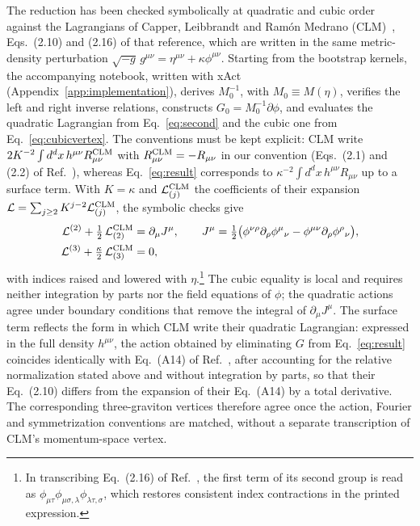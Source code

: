 \documentclass[prd,aps,preprint,nofootinbib,amsmath,amssymb,eqsecnum]{revtex4-2}
\begin{document}
The reduction has been checked symbolically at quadratic and cubic order against the
Lagrangians of Capper, Leibbrandt and Ram\'on Medrano (CLM)~\cite{CLM1973}, Eqs.~(2.10) and
(2.16) of that reference, which are written in the same metric-density perturbation
$\sqrt{-g}\,g^{\mu\nu}=\eta^{\mu\nu}+\kappa\phi^{\mu\nu}$. Starting from the bootstrap
kernels, the accompanying notebook, written with xAct~\cite{xAct,xPerm,xTras}
(Appendix~\ref{app:implementation}), derives
$M_0^{-1}$, with $M_0\equiv M(\eta)$, verifies the left and right inverse relations,
constructs $G_0=M_0^{-1}\partial\phi$, and evaluates the quadratic Lagrangian from
Eq.~\eqref{eq:second} and the cubic one from Eq.~\eqref{eq:cubicvertex}. The conventions
must be kept explicit: CLM write $2K^{-2}\int d^dx\,h^{\mu\nu}R^{\rm CLM}_{\mu\nu}$ with
$R^{\rm CLM}_{\mu\nu}=-R_{\mu\nu}$ in our convention (Eqs.~(2.1) and (2.2) of
Ref.~\cite{CLM1973}), whereas Eq.~\eqref{eq:result}
corresponds to $\kappa^{-2}\int d^dx\,h^{\mu\nu}R_{\mu\nu}$ up to a surface term. With
$K=\kappa$ and $\mathcal L^{\rm CLM}_{(j)}$ the coefficients of their expansion
$\mathcal L=\sum_{j\ge2}K^{j-2}\mathcal L^{\rm CLM}_{(j)}$, the symbolic checks give
\begin{subequations}
\label{eq:clm}
\begin{align}
\mathcal L^{(2)}+\tfrac12\,\mathcal L^{\rm CLM}_{(2)}&=\partial_\mu J^\mu,\qquad
J^\mu=\tfrac12\big(\phi^{\nu\rho}\partial_\rho\phi^{\mu}{}_{\nu}-\phi^{\mu\nu}\partial_\rho\phi^{\rho}{}_{\nu}\big),
\label{eq:clm-quadratic}\\
\mathcal L^{(3)}+\tfrac{\kappa}{2}\,\mathcal L^{\rm CLM}_{(3)}&=0,
\label{eq:clm-cubic}
\end{align}
\end{subequations}
with indices raised and lowered with $\eta$.\footnote{In transcribing Eq.~(2.16) of
Ref.~\cite{CLM1973}, the first term of its second group is read as
$\phi_{\mu\tau}\phi_{\mu\sigma,\lambda}\phi_{\lambda\tau,\sigma}$, which restores consistent
index contractions in the printed expression.} The cubic equality is local and requires
neither integration by parts nor the field equations of $\phi$; the quadratic actions agree
under boundary conditions that remove the integral of $\partial_\mu J^\mu$. The surface term reflects the
form in which CLM write their quadratic Lagrangian: expressed in the full density
$h^{\mu\nu}$, the action obtained by eliminating $G$ from Eq.~\eqref{eq:result} coincides
identically with Eq.~(A14) of Ref.~\cite{CLM1973}, after accounting for the relative
normalization stated above and without integration by parts, so that their
Eq.~(2.10) differs from the expansion of their Eq.~(A14) by a total derivative. The corresponding
three-graviton vertices therefore agree once the action, Fourier and symmetrization
conventions are matched, without a separate transcription of CLM's momentum-space vertex.
\end{document}
